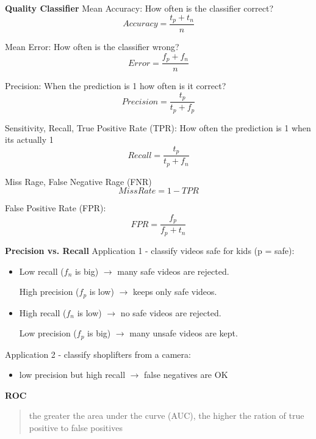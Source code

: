 \documentclass[11pt,twoside,landscape]{article}
\begin{document}
\begin{multicols}{3}
\textbf{Quality Classifier}
Mean Accuracy: How often is the classifier correct?
\begin{equation}
Accuracy = \frac{t_p + t_n}{n}
\end{equation}

Mean Error: How often is the classifier wrong?
\begin{equation}
Error = \frac{f_p + f_n}{n}
\end{equation}

Precision: When the prediction is 1 how often is it correct?
\begin{equation}
Precision = \frac{t_p}{t_p + f_p}
\end{equation}

Sensitivity, Recall, True Positive Rate (TPR): How often the prediction is 1 when its actually 1
\begin{equation}
Recall = \frac{t_p}{t_p + f_n}
\end{equation}

Miss Rage, False Negative Rage (FNR)
\begin{equation}
Miss Rate = 1 - TPR
\end{equation}

False Positive Rate (FPR):
\begin{equation}
FPR = \frac{f_p}{f_p + t_n}
\end{equation}


\textbf{Precision vs. Recall}
Application 1 - classify videos safe for kids (p = safe):
\begin{itemize}
\item Low recall (\(f_n\) is big) \(\rightarrow\) many safe videos are rejected.

High precision (\(f_p\) is low) \(\rightarrow\) keeps only safe videos.

\item High recall (\(f_n\) is low) \(\rightarrow\) no safe videos are rejected.

Low precision (\(f_p\) is big) \(\rightarrow\) many unsafe videos are kept.
\end{itemize}


Application 2 - classify shoplifters from a camera:
\begin{itemize}
\item low precision but high recall \(\rightarrow\) false negatives are OK
\end{itemize}


\textbf{ROC}
\begin{quote}
the greater the area under the curve (AUC), the higher the ration of true positive to false positives
\end{quote}



\end{multicols}
\end{document}
